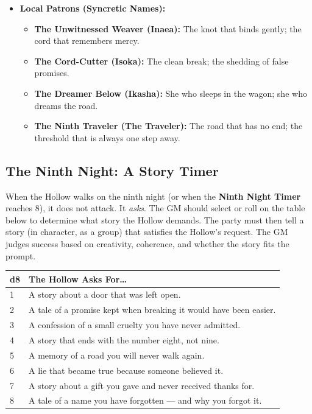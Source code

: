 \begin{itemize}
\item \textbf{Local Patrons (Syncretic Names):}
  \begin{itemize}
    \item \textbf{The Unwitnessed Weaver (Inaea):} The knot that binds gently; the cord that remembers mercy.
    \item \textbf{The Cord-Cutter (Isoka):} The clean break; the shedding of false promises.
    \item \textbf{The Dreamer Below (Ikasha):} She who sleeps in the wagon; she who dreams the road.
    \item \textbf{The Ninth Traveler (The Traveler):} The road that has no end; the threshold that is always one step away.
  \end{itemize}
\end{itemize}

\subsection*{The Ninth Night: A Story Timer }
\label{subsec:tulkani-ninth-night}

When the Hollow walks on the ninth night (or when the \textbf{Ninth Night Timer } reaches $8$), it does not attack. It \emph{asks}. The GM should select or roll on the table below to determine what story the Hollow demands. The party must then tell a story (in character, as a group) that satisfies the Hollow's request. The GM judges success based on creativity, coherence, and whether the story fits the prompt.

\begin{longtable}{|p{}|p{}|}
\hline
\textbf{d8} & \textbf{The Hollow Asks For\dots} \\
\hline
1 & A story about a door that was left open. \\
\hline
2 & A tale of a promise kept when breaking it would have been easier. \\
\hline
3 & A confession of a small cruelty you have never admitted. \\
\hline
4 & A story that ends with the number eight, not nine. \\
\hline
5 & A memory of a road you will never walk again. \\
\hline
6 & A lie that became true because someone believed it. \\
\hline
7 & A story about a gift you gave and never received thanks for. \\
\hline
8 & A tale of a name you have forgotten --- and why you forgot it. \\
\hline
\end{longtable}

